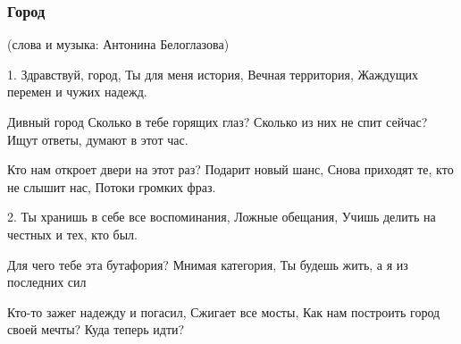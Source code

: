  
 
 

\subsubsection{Город}

(слова и музыка: Антонина Белоглазова)

1. Здравствуй, город,
Ты для меня история,
Вечная территория,
Жаждущих перемен и чужих надежд.

Дивный город
Сколько в тебе горящих глаз?
Сколько из них не спит сейчас?
Ищут ответы, думают в этот час.

Кто нам откроет двери на этот раз?
Подарит новый шанс,
Снова приходят те, кто не слышит нас,
Потоки громких фраз.

2. Ты хранишь в себе все воспоминания,
Ложные обещания,
Учишь делить на честных и тех, кто был.

Для чего тебе эта бутафория?
Мнимая категория,
Ты будешь жить, а я из последних сил

Кто-то зажег надежду и погасил,
Сжигает все мосты,
Как нам построить город своей мечты?
Куда теперь идти?
